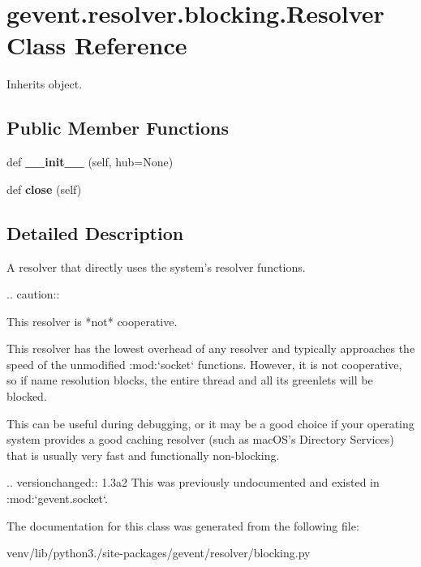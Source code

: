 \hypertarget{classgevent_1_1resolver_1_1blocking_1_1_resolver}{}\section{gevent.\+resolver.\+blocking.\+Resolver Class Reference}
\label{classgevent_1_1resolver_1_1blocking_1_1_resolver}


Inherits object.

\subsection*{Public Member Functions}
\begin{DoxyCompactItemize}
\item 
\mbox{\label{classgevent_1_1resolver_1_1blocking_1_1_resolver_a32a08a6be94c9ca6d3bc0ad3efe12c0e}} 
def {\bfseries \+\_\+\+\_\+init\+\_\+\+\_\+} (self, hub=None)
\item 
\mbox{\label{classgevent_1_1resolver_1_1blocking_1_1_resolver_ae42f4cdc7a0950140c10fbbb2d8ea861}} 
def {\bfseries close} (self)
\end{DoxyCompactItemize}


\subsection{Detailed Description}
\begin{DoxyVerb}A resolver that directly uses the system's resolver functions.

.. caution::

    This resolver is *not* cooperative.

This resolver has the lowest overhead of any resolver and
typically approaches the speed of the unmodified :mod:`socket`
functions. However, it is not cooperative, so if name resolution
blocks, the entire thread and all its greenlets will be blocked.

This can be useful during debugging, or it may be a good choice if
your operating system provides a good caching resolver (such as
macOS's Directory Services) that is usually very fast and
functionally non-blocking.

.. versionchanged:: 1.3a2
   This was previously undocumented and existed in :mod:`gevent.socket`.\end{DoxyVerb}
 

The documentation for this class was generated from the following file\+:\begin{DoxyCompactItemize}
\item 
venv/lib/python3./site-\/packages/gevent/resolver/blocking.\+py\end{DoxyCompactItemize}
